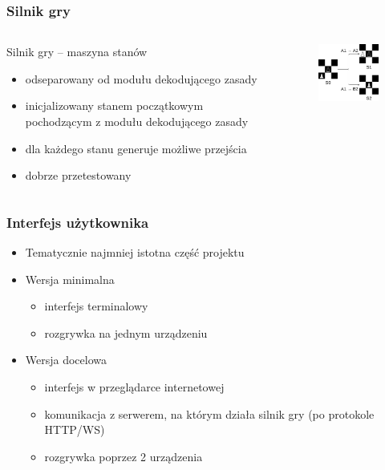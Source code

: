 \documentclass{beamer}
\begin{document}
\begin{frame}
	\frametitle{Silnik gry}
	\begin{columns}
		\begin{column}{.50\textwidth}
			Silnik gry -- maszyna stanów
			\begin{itemize}
				\item odseparowany od modułu dekodującego zasady
				\item inicjalizowany stanem początkowym pochodzącym z modułu dekodującego zasady
				\item dla każdego stanu generuje możliwe przejścia
				\item dobrze przetestowany
			\end{itemize}
		\end{column}%
		\hfill
		\begin{column}{.50\textwidth}
			\begin{figure}
				\includegraphics[width=4.5cm]{stany.png}
				\centering
			\end{figure}
		\end{column}
	\end{columns}
\end{frame}

\begin{frame}
	\frametitle{Interfejs użytkownika}
	\begin{itemize}
		\item Tematycznie najmniej istotna część projektu
		\item Wersja minimalna
		      \begin{itemize}
			      \item interfejs terminalowy
			      \item rozgrywka na jednym urządzeniu
		      \end{itemize}
		\item Wersja docelowa
		      \begin{itemize}
			      \item interfejs w przeglądarce internetowej
			      \item komunikacja z serwerem, na którym działa silnik gry (po protokole HTTP/WS)
			      \item rozgrywka poprzez 2 urządzenia
		      \end{itemize}
	\end{itemize}
\end{frame}
\end{document}
